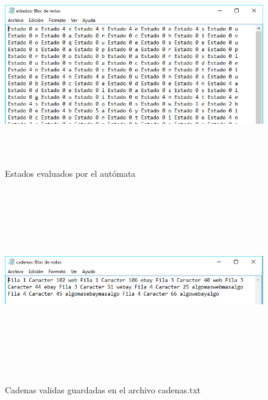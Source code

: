 \documentclass[12pt]{article}
\begin{document}
\begin{figure}[H]
\begin{center}
\includegraphics[width=\textwidth, height=8cm]{auto_webay_estado}
\label{ }
\caption{Estados evaluados por el autómata}
\end{center}
\end{figure}


\begin{figure}[H]
\begin{center}
\includegraphics[width=\textwidth, height=8cm]{auto_webay_cadenas}
\label{ }
\caption{Cadenas validas guardadas en el archivo cadenas.txt}
\end{center}
\end{figure}
\end{document}
